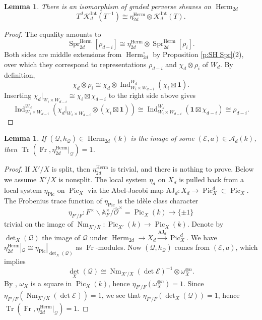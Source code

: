 \documentclass[reqno]{amsart}
\numberwithin{equation}{section}
\newcommand{\BA}{\ensuremath{\mathbb{A}}\xspace}
\newcommand{\wh}[1]{\widehat{#1}}
\newcommand{\mrm}[1]{\mathrm{#1}}
\newcommand{\bs}{\backslash}
\DeclareMathOperator{\Frob}{Fr}
\DeclareMathOperator{\Tr}{Tr}
\DeclareMathOperator{\Ind}{Ind}
\DeclareMathOperator{\Nm}{Nm}
\DeclareMathOperator{\Pic}{Pic}
\DeclareMathOperator{\Herm}{Herm}
\DeclareMathOperator{\Spr}{Spr}
\DeclareMathOperator{\Int}{Int}
\newcommand{\bt}{\boxtimes}
\newcommand\xr{\xrightarrow}
\newcommand\ot{\otimes}
\newcommand\one{\mathbf{1}}
\renewcommand\c{\circ}
\newcommand{\y}{\eta}
\newcommand{\om}{\omega}
\renewcommand{\r}{\rho}
\newcommand\cA{\mathcal{A}}
\newcommand\cE{\mathcal{E}}
\newcommand\cK{\mathcal{K}}
\newcommand\cO{\mathcal{O}}
\newcommand\cQ{\mathcal{Q}}
\newtheorem{lemma}[thm]{Lemma}
\theoremstyle{remark}
\numberwithin{equation}{section}
\begin{document}
\begin{lemma} There is an isomorphism of graded perverse sheaves on $\Herm_{2d}$
\begin{equation}
T^{d}\cK_d^{\Int}(T^{-1})\cong \y^{\Herm}_{2d}\ot \cK^{\Int}_{d}(T).
\end{equation}
\end{lemma}
\begin{proof}
The equality amounts to 
\begin{equation}
\Spr^{\Herm}_{2d}[\r_{d-i}]\cong \y^{\Herm}_{2d}\ot\Spr^{\Herm}_{2d}[\r_{i}].
\end{equation}
Both sides are middle extensions from $\Herm^{\c}_{2d}$ by Proposition \ref{p:SH Spr}(2), over which they correspond to representations $\r_{d-i}$ and $\chi_{d}\ot \r_{i}$ of $W_{d}$. By definition, 
\begin{equation}
\chi_{d}\ot\r_{i}\cong \chi_{d}\ot\Ind^{W_{d}}_{W_{i}\times W_{d-i}}(\chi_{i}\bt\one).
\end{equation}
Inserting $\chi_{d}|_{W_{i}\times W_{d-i}}\cong \chi_{i}\bt \chi_{d-i}$ to the right side above gives 
\begin{equation}
\Ind^{W_{d}}_{W_{i}\times W_{d-i}}(\chi_{d}|_{W_{i}\times W_{d-i}}\ot(\chi_{i}\bt\one))\cong \Ind^{W_{d}}_{W_{i}\times W_{d-i}}(\one\bt\chi_{d-i})\cong \r_{d-i}.
\end{equation}
\end{proof}

\begin{lemma}
If $(\cQ,h_{\cQ})\in \Herm_{2d}(k)$ is the image of some $(\cE,a)\in \cA_{d}(k)$, then $\Tr(\Frob, \y^{\Herm}_{2d}|_{\cQ})=1$.
\end{lemma}
\begin{proof} If $X'/X$ is split, then $\y^{\Herm}_{2d}$ is trivial, and there is nothing to prove. Below we assume $X'/X$ is nonsplit. The local system $\y_{d}$ on $X_{d}$ is pulled back from a local system $\y_{\Pic}$ on $\Pic_{X}$ via the Abel-Jacobi map $\mrm{AJ}_{d}:X_{d}\to \Pic^{d}_{X}\subset \Pic_{X}$. The Frobenius trace function of $\y_{\Pic}$ is the id\`ele class character 
\[
\y_{F'/F}: F^{\times}\bs\BA^{\times}_{F}/\wh\cO^{\times}=\Pic_{X}(k)\to\{\pm1\}
\]
trivial on the image of $\Nm_{X'/X}: \Pic_{X'}(k)\to \Pic_{X}(k)$. Denote by $\det_{X}(\cQ)$ the image of $\cQ$ under $\Herm_{2d}\to X_{d}\xr{\mrm{AJ}_{d}} \Pic^{d}_{X}$. We have $\y^{\Herm}_{2d}|_{\cQ}\cong \y_{\Pic}|_{\det_{X}(\cQ)}$ as $\Frob$-modules. Now $(\cQ,h_{\cQ})$ comes from $(\cE,a)$, which implies
\begin{equation*}
{\det}_{X}(\cQ)\cong \Nm_{X'/X}(\det\cE)^{-1}\ot \om_{X}^{\ot n}.
\end{equation*}
By \cite[p.291, Theorem 13]{Weil}, $\om_{X}$ is a square in $\Pic_{X}(k)$, hence $\y_{F'/F}(\om_{X}^{\ot n})=1$. Since $\y_{F'/F}(\Nm_{X'/X}(\det\cE))=1$, we see that $\y_{F'/F}(\det_{X}(\cQ))=1$, hence $\Tr(\Frob, \y^{\Herm}_{2d}|_{\cQ})=1$.
\end{proof}
\end{document}
